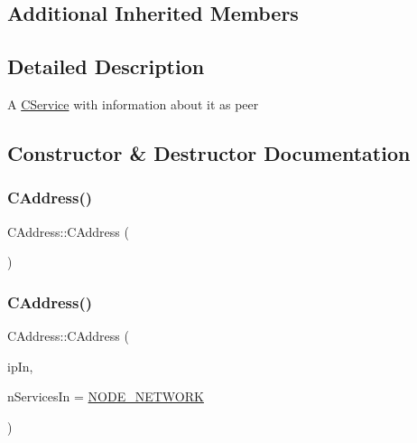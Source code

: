 \subsection*{Additional Inherited Members}


\subsection{Detailed Description}
A \mbox{\hyperlink{class_c_service}{C\+Service}} with information about it as peer 

\subsection{Constructor \& Destructor Documentation}
\mbox{\label{class_c_address_a84cd336180580ab69b8888a4339ccc37}} 
\subsubsection{\texorpdfstring{C\+Address()}{CAddress()}\hspace{0.1cm}{\footnotesize\ttfamily [1/2]}}
{\footnotesize\ttfamily C\+Address\+::\+C\+Address (\begin{DoxyParamCaption}{ }\end{DoxyParamCaption})}

\mbox{\label{class_c_address_a806e75f363ec49bfab92a686a8774ac3}} 
\subsubsection{\texorpdfstring{C\+Address()}{CAddress()}\hspace{0.1cm}{\footnotesize\ttfamily [2/2]}}
{\footnotesize\ttfamily C\+Address\+::\+C\+Address (\begin{DoxyParamCaption}\item[{\mbox{\hyperlink{class_c_service}{C\+Service}}}]{ip\+In,  }\item[{uint64\+\_\+t}]{n\+Services\+In = {\ttfamily \mbox{\hyperlink{protocol_8h_a726ca809ffd3d67ab4b8476646f26635a9d1154f0e7e56f183a5c8373abe2e86c}{N\+O\+D\+E\+\_\+\+N\+E\+T\+W\+O\+RK}}} }\end{DoxyParamCaption})\hspace{0.3cm}{\ttfamily [explicit]}}




